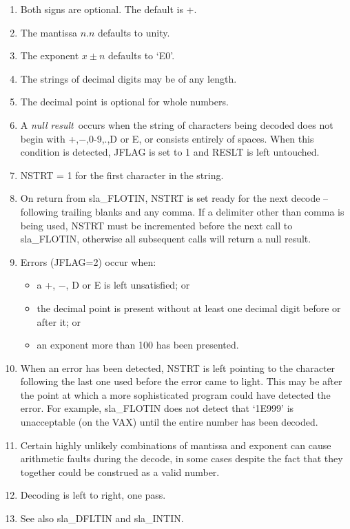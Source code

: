 {\begin{enumerate}
\begin{itemize}
             is reached.
       \end{itemize}
 \item Both signs are optional.  The default is +.
 \item The mantissa $n.n$ defaults to unity.
 \item The exponent $x\!\pm\!n$ defaults to `E0'.
 \item The strings of decimal digits may be of any length.
 \item The decimal point is optional for whole numbers.
 \item A {\it null result}\, occurs when the string of characters
       being decoded does not begin with +,$-$,0-9,.,D or E, or
       consists entirely of spaces.  When this condition is
       detected, JFLAG is set to 1 and RESLT is left untouched.
 \item NSTRT = 1 for the first character in the string.
 \item On return from sla\_FLOTIN, NSTRT is set ready for the next
       decode -- following trailing blanks and any comma.  If a
       delimiter other than comma is being used, NSTRT must be
       incremented before the next call to sla\_FLOTIN, otherwise
       all subsequent calls will return a null result.
 \item Errors (JFLAG=2) occur when:
       \begin{itemize}
       \item a +, $-$, D or E is left unsatisfied; or
       \item the decimal point is present without at least
             one decimal digit before or after it; or
       \item an exponent more than 100 has been presented.
       \end{itemize}
 \item When an error has been detected, NSTRT is left
       pointing to the character following the last
       one used before the error came to light.  This
       may be after the point at which a more sophisticated
       program could have detected the error.  For example,
       sla\_FLOTIN does not detect that `1E999' is unacceptable
       (on the VAX) until the entire number has been decoded.
 \item Certain highly unlikely combinations of mantissa and
       exponent can cause arithmetic faults during the
       decode, in some cases despite the fact that they
       together could be construed as a valid number.
 \item Decoding is left to right, one pass.
 \item See also sla\_DFLTIN and sla\_INTIN.
 \end{enumerate}
}
